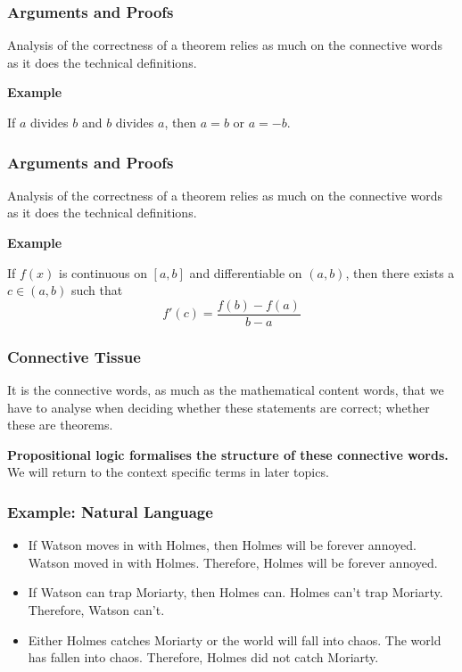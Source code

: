 \documentclass{beamer}
\begin{document}
\begin{frame}
	\frametitle{Arguments and Proofs}
  
	Analysis of the correctness of a theorem relies as much on the connective words as it does the technical definitions. 
  
  {\bf Example}
  
  If $a$ divides $b$ and $b$ divides $a$, then $a = b$ or $a = -b$. 

  \vspace{50mm}
  
  \end{frame}

  \begin{frame}
	\frametitle{Arguments and Proofs}
  
	Analysis of the correctness of a theorem relies as much on the connective words as it does the technical definitions. 
   
	{\bf Example}
	
	If $f(x)$ is continuous on $[a,b]$ and differentiable on $(a,b)$, then there exists a $c \in (a,b)$ such that $$f'(c) = \frac{f(b)-f(a)}{b-a}$$

	\vspace{20mm}
  
  \end{frame}

\begin{frame}
	\frametitle{Connective Tissue}

	It is the connective words, as much as the mathematical content words, that we have to analyse when deciding whether these statements are correct; whether these are theorems.

	\vspace{5mm}

	{\bf Propositional logic formalises the structure of these connective words.} We will return to the context specific terms in later topics. 

\end{frame}

\begin{frame}
	\frametitle{Example: Natural Language}
	
	\begin{itemize}
		\item If Watson moves in with Holmes, then Holmes will be forever annoyed. Watson moved in with Holmes. Therefore, Holmes will be forever annoyed.
		\vspace{10mm}
		\item If Watson can trap Moriarty, then Holmes can. Holmes can't trap Moriarty. Therefore, Watson can't.
		\vspace{10mm}
		\item Either Holmes catches Moriarty or the world will fall into chaos. The world has fallen into chaos. Therefore, Holmes did not catch Moriarty.
		
	\end{itemize}	
\end{frame}
\end{document}
